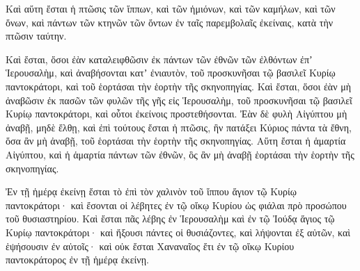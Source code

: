 {Καὶ αὕτη ἔσται ἡ πτῶσις τῶν ἵππων, καὶ τῶν ἡμιόνων, καὶ τῶν καμήλων, καὶ τῶν ὄνων, καὶ πάντων τῶν κτηνῶν τῶν ὄντων ἐν ταῖς παρεμβολαῖς ἐκείναις, κατὰ τὴν πτῶσιν ταύτην.
\par }{\PP {}Καὶ ἔσται, ὅσοι ἐὰν καταλειφθῶσιν ἐκ πάντων τῶν ἐθνῶν τῶν ἐλθόντων ἐπʼ Ἱερουσαλὴμ, καὶ ἀναβήσονται κατʼ ἐνιαυτὸν, τοῦ προσκυνῆσαι τῷ βασιλεῖ Κυρίῳ παντοκράτορι, καὶ τοῦ ἑορτάσαι τὴν ἑορτὴν τῆς σκηνοπηγίας.
Καὶ ἔσται, ὅσοι ἐὰν μὴ ἀναβῶσιν ἐκ πασῶν τῶν φυλῶν τῆς γῆς εἰς Ἱερουσαλὴμ, τοῦ προσκυνῆσαι τῷ βασιλεῖ Κυρίῳ παντοκράτορι, καὶ οὗτοι ἐκείνοις προστεθήσονται.
Ἐὰν δὲ φυλὴ Αἰγύπτου μὴ ἀναβῇ, μηδὲ ἔλθῃ, καὶ ἐπὶ τούτους ἔσται ἡ πτῶσις, ἣν πατάξει Κύριος πάντα τὰ ἔθνη, ὅσα ἂν μὴ ἀναβῇ, τοῦ ἑορτάσαι τὴν ἑορτὴν τῆς σκηνοπηγίας.
Αὕτη ἔσται ἡ ἁμαρτία Αἰγύπτου, καὶ ἡ ἁμαρτία πάντων τῶν ἐθνῶν, ὃς ἂν μὴ ἀναβῇ ἑορτάσαι τὴν ἑορτὴν τῆς σκηνοπηγίας.
\par }{\PP {}Ἐν τῇ ἡμέρᾳ ἐκείνῃ ἔσται τὸ ἐπὶ τὸν χαλινὸν τοῦ ἵππου ἅγιον τῷ Κυρίῳ παντοκράτορι· καὶ ἔσονται οἱ λέβητες ἐν τῷ οἴκῳ Κυρίου ὡς φιάλαι πρὸ προσώπου τοῦ θυσιαστηρίου.
Καὶ ἔσται πᾶς λέβης ἐν Ἱερουσαλὴμ καὶ ἐν τῷ Ἰούδᾳ ἅγιος τῷ Κυρίῳ παντοκράτορι· καὶ ἥξουσι πάντες οἱ θυσιάζοντες, καὶ λήψονται ἐξ αὐτῶν, καὶ ἑψήσουσιν ἐν αὐτοῖς· καὶ οὐκ ἔσται Χαναναῖος ἔτι ἐν τῷ οἴκῳ Κυρίου παντοκράτορος ἐν τῇ ἡμέρᾳ ἐκείνῃ.
\par }
